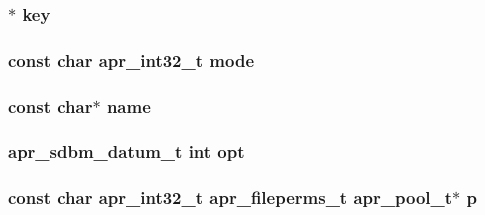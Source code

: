 \subsubsection[{\texorpdfstring{key}{key}}]{$\ast$ key}\hypertarget{group__APR__Util__DBM__SDBM_ga3aaa51a0f0ad91af61adcd67436260aa}{}\label{group__APR__Util__DBM__SDBM_ga3aaa51a0f0ad91af61adcd67436260aa}
\subsubsection[{\texorpdfstring{mode}{mode}}]{\setlength{\rightskip}{0pt plus 5cm}const char {\bf apr\+\_\+int32\+\_\+t} mode}\hypertarget{group__APR__Util__DBM__SDBM_ga719919dff9b073c668fd47f22f420774}{}\label{group__APR__Util__DBM__SDBM_ga719919dff9b073c668fd47f22f420774}
\subsubsection[{\texorpdfstring{name}{name}}]{\setlength{\rightskip}{0pt plus 5cm}const char$\ast$ name}\hypertarget{group__APR__Util__DBM__SDBM_ga8f8f80d37794cde9472343e4487ba3eb}{}\label{group__APR__Util__DBM__SDBM_ga8f8f80d37794cde9472343e4487ba3eb}
\subsubsection[{\texorpdfstring{opt}{opt}}]{ {\bf apr\+\_\+sdbm\+\_\+datum\+\_\+t} {\bf int} opt}\hypertarget{group__APR__Util__DBM__SDBM_ga7dabf0be7fe6c0e41bab93d005632e83}{}\label{group__APR__Util__DBM__SDBM_ga7dabf0be7fe6c0e41bab93d005632e83}
\subsubsection[{\texorpdfstring{p}{p}}]{\setlength{\rightskip}{0pt plus 5cm}const char {\bf apr\+\_\+int32\+\_\+t} {\bf apr\+\_\+fileperms\+\_\+t} {\bf apr\+\_\+pool\+\_\+t}$\ast$ p}\hypertarget{group__APR__Util__DBM__SDBM_ga766306d113a8e2b594eaaae5b3156b2e}{}\label{group__APR__Util__DBM__SDBM_ga766306d113a8e2b594eaaae5b3156b2e}
